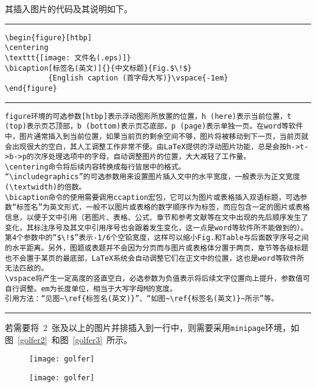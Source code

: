其插入图片的代码及其说明如下。
\vspace{1em}\noindent\hrule
\begin{verbatim}
\begin{figure}[htbp]
\centering
\texttt{[image: 文件名(.eps)]}
\bicaption[标签名(英文)]{}{中文标题}{Fig.$\!$}
          {English caption (首字母大写)}\vspace{-1em}
\end{figure}
\end{verbatim}
\noindent\hrule
\begin{verbatim}
figure环境的可选参数[htbp]表示浮动图形所放置的位置，h (here)表示当前位置，t (top)表示页芯顶部，b (bottom)表示页芯底部，p (page)表示单独一页。在word等软件中，图片通常插入到当前位置，如果当前页的剩余空间不够，图片将被移动到下一页，当前页就会出现很大的空白，其人工调整工作非常不便。由LaTeX提供的浮动图片功能，总是会按h->t->b->p的次序处理选项中的字母，自动调整图片的位置，大大减轻了工作量。
\centering命令将后续内容转换成每行皆居中的格式。
“\includegraphics”的可选参数用来设置图片插入文中的水平宽度，一般表示为正文宽度(\textwidth)的倍数。
\bicaption命令的使用需要调用ccaption宏包，它可以为图片或表格插入双语标题，可选参数“标签名”为英文形式，一般不以图片或表格的数字顺序作为标签，而应包含一定的图片或表格信息，以便于文中引用（若图片、表格、公式、章节和参考文献等在文中出现的先后顺序发生了变化，其标注序号及其文中引用序号也会跟着发生变化，这一点是word等软件所不能做到的）。第4个参数中的“$\!$”表示-1/6个空铅宽度，这样可以缩小Fig.和Table与后面数字序号之间的水平距离。另外，图题或表题并不会因为分页而与图片或表格体分置于两页，章节等各级标题也不会置于某页的最底部，LaTeX系统会自动调整它们在正文中的位置，这也是word等软件所无法匹敌的。
\vspace将产生一定高度的竖直空白，必选参数为负值表示将后续文字位置向上提升，参数值可自行调整。em为长度单位，相当于大写字母M的宽度。
引用方法：“见图~\ref{标签名(英文)}”、“如图~\ref{标签名(英文)}~所示”等。
\end{verbatim}
\noindent\hrule\vspace{1em}
若需要将~2~张及以上的图片并排插入到一行中，则需要采用\verb|minipage|环境，如图~\ref{golfer2}~和图~\ref{golfer3}~所示。
\begin{figure}[htbp]
\centering
\begin{minipage}{0.4\textwidth}
\centering
\texttt{[image: golfer]}
\end{minipage}
\begin{minipage}{0.4\textwidth}
\centering
\texttt{[image: golfer]}
\end{minipage}\vspace{-1em}
\end{figure}

